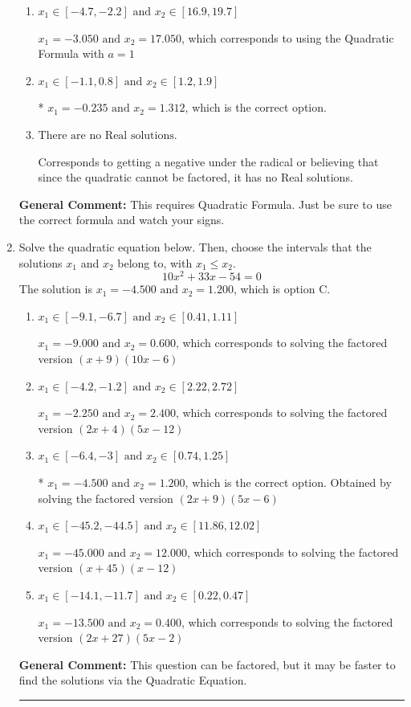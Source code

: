 \documentclass{extbook}[14pt]
\newcommand{\litem}[1]{\item #1

\rule{\textwidth}{0.4pt}}
\begin{document}
\begin{enumerate}
{\begin{enumerate}[label=\Alph*.]
 $x_1 = -19.561 \text{ and } x_2 = 20.638$, which corresponds to writing the Quadratic Formula as $-\frac{b}{2a} \pm \sqrt{b^2 - 4ac}$.
\item \( x_1 \in [-4.7, -2.2] \text{ and } x_2 \in [16.9, 19.7] \)

 $x_1 = -3.050 \text{ and } x_2 = 17.050$, which corresponds to using the Quadratic Formula with $a=1$
\item \( x_1 \in [-1.1, 0.8] \text{ and } x_2 \in [1.2, 1.9] \)

* $x_1 = -0.235 \text{ and } x_2 = 1.312$, which is the correct option.
\item \( \text{There are no Real solutions.} \)

Corresponds to getting a negative under the radical or believing that since the quadratic cannot be factored, it has no Real solutions.
\end{enumerate}

\textbf{General Comment:} This requires Quadratic Formula. Just be sure to use the correct formula and watch your signs.
}
\litem{
Solve the quadratic equation below. Then, choose the intervals that the solutions $x_1$ and $x_2$ belong to, with $x_1 \leq x_2$.
\[ 10x^{2} +33 x -54 = 0 \]
The solution is \( x_1 = -4.500 \text{ and } x_2 = 1.200 \), which is option C.\begin{enumerate}[label=\Alph*.]
\item \( x_1 \in [-9.1, -6.7] \text{ and } x_2 \in [0.41, 1.11] \)

$x_1 = -9.000 \text{ and } x_2 = 0.600$, which corresponds to solving the factored version $(x + 9)(10x -6)$
\item \( x_1 \in [-4.2, -1.2] \text{ and } x_2 \in [2.22, 2.72] \)

$x_1 = -2.250 \text{ and } x_2 = 2.400$, which corresponds to solving the factored version $(2x + 4)(5x -12)$
\item \( x_1 \in [-6.4, -3] \text{ and } x_2 \in [0.74, 1.25] \)

* $x_1 = -4.500 \text{ and } x_2 = 1.200$, which is the correct option. Obtained by solving the factored version $(2x + 9)(5x -6)$
\item \( x_1 \in [-45.2, -44.5] \text{ and } x_2 \in [11.86, 12.02] \)

$x_1 = -45.000 \text{ and } x_2 = 12.000$, which corresponds to solving the factored version $(x + 45)(x -12)$
\item \( x_1 \in [-14.1, -11.7] \text{ and } x_2 \in [0.22, 0.47] \)

$x_1 = -13.500 \text{ and } x_2 = 0.400$, which corresponds to solving the factored version $(2x + 27)(5x -2)$
\end{enumerate}

\textbf{General Comment:} This question can be factored, but it may be faster to find the solutions via the Quadratic Equation.
}
\end{enumerate}
\end{document}
